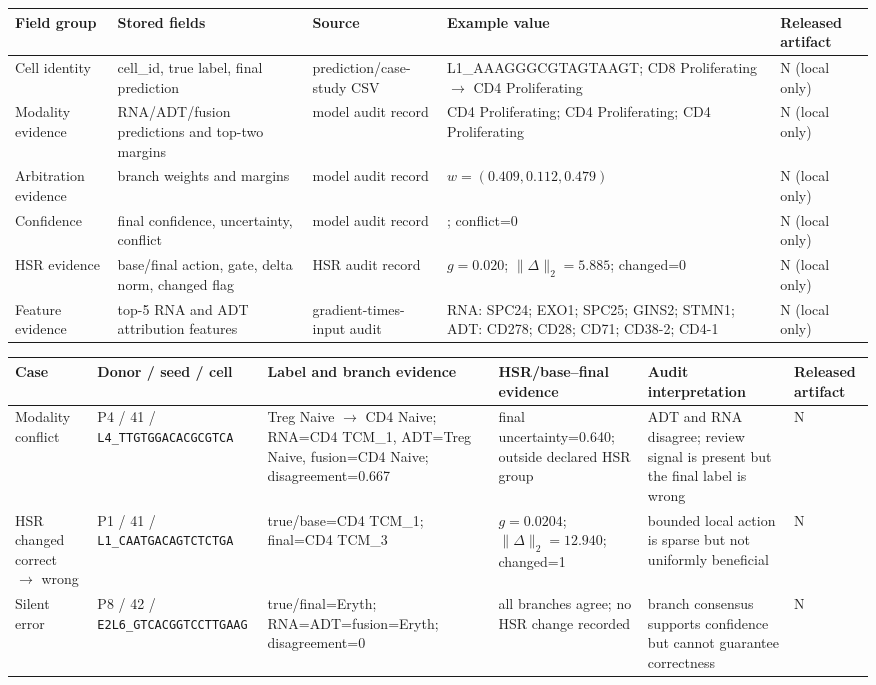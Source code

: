 \begin{tabular}{@{}>{\raggedright\arraybackslash}p{}>{\raggedright\arraybackslash}p{}>{\raggedright\arraybackslash}p{}>{\raggedright\arraybackslash}p{}>{\raggedright\arraybackslash}p{}@{}}
\toprule
Field group & Stored fields & Source & Example value & Released artifact \\
\midrule
Cell identity & cell\_id, true label, final prediction & prediction/case-study CSV & L1\_AAAGGGCGTAGTAAGT; CD8 Proliferating $\to$ CD4 Proliferating & N (local only) \\
Modality evidence & RNA/ADT/fusion predictions and top-two margins & model audit record & CD4 Proliferating; CD4 Proliferating; CD4 Proliferating & N (local only) \\
Arbitration evidence & branch weights and margins & model audit record & $w=(0.409, 0.112, 0.479)$ & N (local only) \\
Confidence & final confidence, uncertainty, conflict & model audit record & 0.854; conflict=0 & N (local only) \\
HSR evidence & base/final action, gate, delta norm, changed flag & HSR audit record & $g=0.020$; $\|\Delta\|_2=5.885$; changed=0 & N (local only) \\
Feature evidence & top-5 RNA and ADT attribution features & gradient-times-input audit & RNA: SPC24; EXO1; SPC25; GINS2; STMN1; ADT: CD278; CD28; CD71; CD38-2; CD4-1 & N (local only) \\
\bottomrule
\end{tabular}

\vspace{0.35em}
\begin{tabular}{@{}>{\raggedright\arraybackslash}p{}>{\raggedright\arraybackslash}p{}>{\raggedright\arraybackslash}p{}>{\raggedright\arraybackslash}p{}>{\raggedright\arraybackslash}p{}>{\raggedright\arraybackslash}p{}@{}}
\toprule
Case & Donor / seed / cell & Label and branch evidence & HSR/base--final evidence & Audit interpretation & Released artifact \\
\midrule
Modality conflict & P4 / 41 / \texttt{L4\_TTGTGGACACGCGTCA} & Treg Naive $\rightarrow$ CD4 Naive; RNA=CD4 TCM\_1, ADT=Treg Naive, fusion=CD4 Naive; disagreement=0.667 & final uncertainty=0.640; outside declared HSR group & ADT and RNA disagree; review signal is present but the final label is wrong & N \\
HSR changed correct $\rightarrow$ wrong & P1 / 41 / \texttt{L1\_CAATGACAGTCTCTGA} & true/base=CD4 TCM\_1; final=CD4 TCM\_3 & $g=0.0204$; $\|\Delta\|_2=12.940$; changed=1 & bounded local action is sparse but not uniformly beneficial & N \\
Silent error & P8 / 42 / \texttt{E2L6\_GTCACGGTCCTTGAAG} & true/final=Eryth; RNA=ADT=fusion=Eryth; disagreement=0 & all branches agree; no HSR change recorded & branch consensus supports confidence but cannot guarantee correctness & N \\
\bottomrule
\end{tabular}

